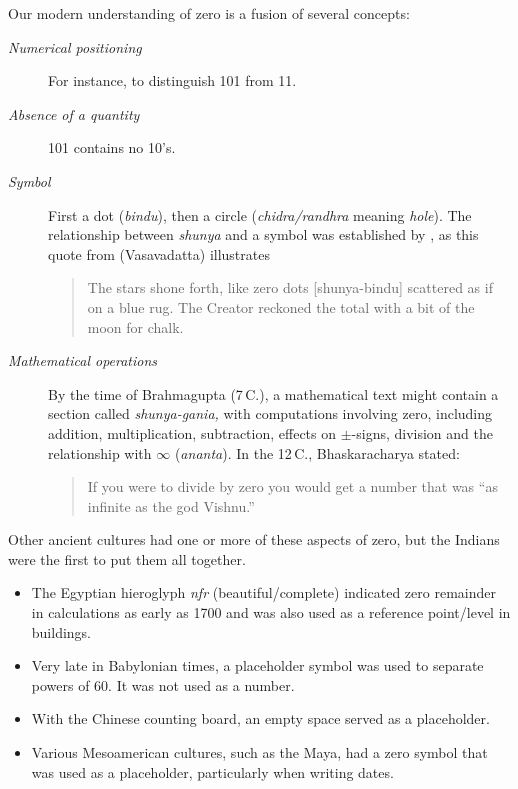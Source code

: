 Our modern understanding of zero is a fusion of several concepts:
\begin{description}
	\item[\normalfont\emph{Numerical positioning}] For instance, to distinguish 101 from 11.
	\item[\normalfont\emph{Absence of a quantity}] 101 contains no 10's.
	\item[\normalfont\emph{Symbol}] First a dot (\emph{bindu}), then a circle (\emph{chidra/randhra} meaning \emph{hole}). The relationship between \emph{shunya} and a symbol was established by , as this quote from  (Vasavadatta) illustrates
	\begin{quote}
		The stars shone forth, like zero dots [shunya-bindu] scattered as if on a blue rug. The Creator reckoned the total with a bit of the moon for chalk.
	\end{quote}
	\item[\normalfont\emph{Mathematical operations}] By the time of Brahmagupta (7\th\,C.), a mathematical text might contain a section called \emph{shunya-gania,} with computations involving zero, including addition, multiplication, subtraction, effects on $\pm$-signs, division and the relationship with $\infty$ (\emph{ananta}). In the 12\th\,C., Bhaskaracharya stated:
	\begin{quote}
	If you were to divide by zero you would get a number that was ``as infinite as the god Vishnu.''
	\end{quote}
\end{description}


Other ancient cultures had one or more of these aspects of zero, but the Indians were the first to put them all together.
\begin{itemize}
  \item The Egyptian hieroglyph \emph{nfr} (beautiful/complete) indicated zero remainder in calculations as early as 1700\BC{} and was also used as a reference point/level in buildings.
  \item Very late in Babylonian times, a placeholder symbol was used to separate powers of 60. It was not used as a number.
  \item With the Chinese counting board, an empty space served as a placeholder.
  \item Various Mesoamerican cultures, such as the Maya, had a zero symbol that was used as a placeholder, particularly when writing dates. 
\end{itemize}


